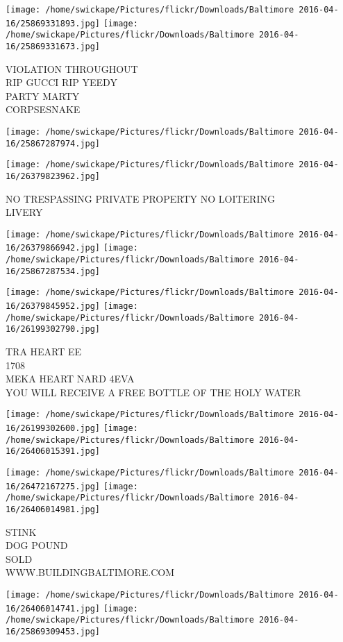 \documentclass[10pt,letterpaper]{article}
\begin{document}
\texttt{[image: /home/swickape/Pictures/flickr/Downloads/Baltimore 2016-04-16/25869331893.jpg]}
\texttt{[image: /home/swickape/Pictures/flickr/Downloads/Baltimore 2016-04-16/25869331673.jpg]}

VIOLATION THROUGHOUT\\
RIP GUCCI RIP YEEDY\\
PARTY MARTY\\
CORPSESNAKE
\pagebreak

\texttt{[image: /home/swickape/Pictures/flickr/Downloads/Baltimore 2016-04-16/25867287974.jpg]}

\vspace{0.25in}
\texttt{[image: /home/swickape/Pictures/flickr/Downloads/Baltimore 2016-04-16/26379823962.jpg]}

NO TRESPASSING PRIVATE PROPERTY NO LOITERING\\
LIVERY
\pagebreak

\texttt{[image: /home/swickape/Pictures/flickr/Downloads/Baltimore 2016-04-16/26379866942.jpg]}
\texttt{[image: /home/swickape/Pictures/flickr/Downloads/Baltimore 2016-04-16/25867287534.jpg]}

\texttt{[image: /home/swickape/Pictures/flickr/Downloads/Baltimore 2016-04-16/26379845952.jpg]}
\texttt{[image: /home/swickape/Pictures/flickr/Downloads/Baltimore 2016-04-16/26199302790.jpg]}

TRA HEART EE\\
1708\\
MEKA HEART NARD 4EVA\\
YOU WILL RECEIVE A FREE BOTTLE OF THE HOLY WATER
\pagebreak

\texttt{[image: /home/swickape/Pictures/flickr/Downloads/Baltimore 2016-04-16/26199302600.jpg]}
\texttt{[image: /home/swickape/Pictures/flickr/Downloads/Baltimore 2016-04-16/26406015391.jpg]}

\texttt{[image: /home/swickape/Pictures/flickr/Downloads/Baltimore 2016-04-16/26472167275.jpg]}
\texttt{[image: /home/swickape/Pictures/flickr/Downloads/Baltimore 2016-04-16/26406014981.jpg]}

STINK\\
DOG POUND\\
SOLD\\
WWW.BUILDINGBALTIMORE.COM
\pagebreak

\texttt{[image: /home/swickape/Pictures/flickr/Downloads/Baltimore 2016-04-16/26406014741.jpg]}
\texttt{[image: /home/swickape/Pictures/flickr/Downloads/Baltimore 2016-04-16/25869309453.jpg]}
\end{document}
